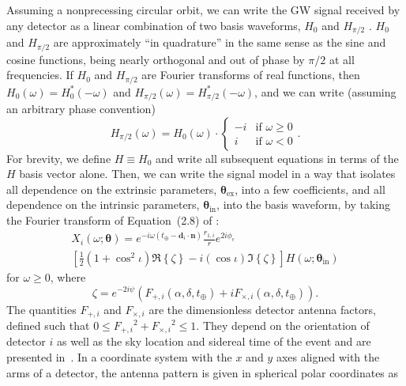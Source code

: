 \documentclass[amsmath,amssymb,aps,prx,reprint,nopreprintnumbers,nofootinbib,showpacs]{revtex4-1}
\begin{document}
Assuming a nonprecessing circular orbit, we can write the \ac{GW} signal received by any detector as a linear combination of two basis waveforms, $H_0$ and $H_{\pi/2}$ \citep{PhysRevD.83.084002}. $H_0$ and $H_{\pi/2}$ are approximately ``in quadrature'' in the same sense as the sine and cosine functions, being nearly orthogonal and out of phase by ${\pi/2}$ at all frequencies. If $H_0$ and $H_{\pi/2}$ are Fourier transforms of real functions, then $H_0(\omega) = H_0^*(-\omega)$ and $H_{\pi/2}(\omega) = H_{\pi/2}^*(-\omega)$, and we can write (assuming an arbitrary phase convention)
%
\begin{equation}
    H_{\pi/2}(\omega) = H_0(\omega) \cdot
    \begin{cases}
        -i & \text{if } \omega \geq 0 \\
        i & \text{if } \omega < 0
    \end{cases}.
\end{equation}
%
For brevity, we define $H \equiv H_{0}$ and write all subsequent equations in terms of the $H$ basis vector alone. Then, we can write the signal model in a way that isolates all dependence on the extrinsic parameters, $\bm\theta_\mathrm{ex}$, into a few coefficients, and all dependence on the intrinsic parameters, $\bm\theta_\mathrm{in}$, into the basis waveform, by taking the Fourier transform of Equation~(2.8) of \cite{PhysRevD.83.084002}:
%
\begin{multline}\label{eq:full-signal-model}
    X_i(\omega; \bm\theta) = e^{-i \omega (t_\oplus - \mathbf{d}_i \cdot \mathbf{n})}
    \frac{r_{1,i}}{r}
    e^{2 i \phi_c}
    \\
    \left[
    \frac{1}{2} \left(1 + \cos^2 \iota\right) \Re \left\{\zeta\right\} - i
    \left(\cos\iota\right) \Im \left\{\zeta\right\}
    \right]
    H(\omega; \bm\theta_\mathrm{in})
\end{multline}
%
for $\omega \geq 0$, where
%
\begin{equation}
    \zeta = e^{-2 i \psi} \left(
    F_{+,i}(\alpha, \delta, t_\oplus) +
    i F_{\times,i}(\alpha, \delta, t_\oplus)
    \right).
\end{equation}
%
The quantities $F_{+,i}$ and $F_{\times,i}$ are the dimensionless detector antenna factors, defined such that $0 \leq {F_{+,i}}^2 + {F_{\times,i}}^2 \leq 1$. They depend on the orientation of detector $i$ as well as the sky location and sidereal time of the event and are presented in~\cite{ExcessPower}. In a coordinate system with the $x$ and $y$ axes aligned with the arms of a detector, the antenna pattern is given in spherical polar coordinates as
\end{document}

